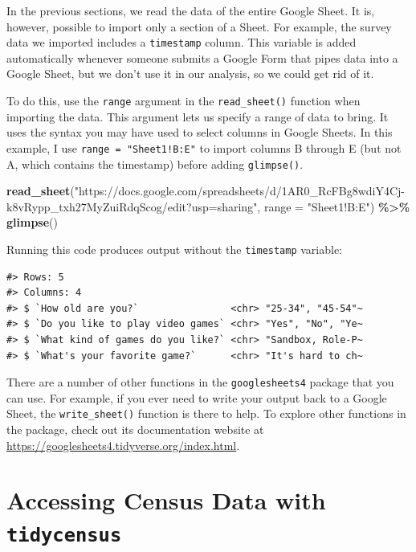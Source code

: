 \documentclass[
]{book}
\newenvironment{Shaded}{\begin{snugshade}}{\end{snugshade}}
\newcommand{\AttributeTok}[1]{\textcolor[rgb]{0.13,0.29,0.53}{#1}}
\newcommand{\FunctionTok}[1]{\textcolor[rgb]{0.13,0.29,0.53}{\textbf{#1}}}
\newcommand{\NormalTok}[1]{#1}
\newcommand{\SpecialCharTok}[1]{\textcolor[rgb]{0.81,0.36,0.00}{\textbf{#1}}}
\newcommand{\StringTok}[1]{\textcolor[rgb]{0.31,0.60,0.02}{#1}}
\begin{document}
In the previous sections, we read the data of the entire Google Sheet. It is, however, possible to import only a section of a Sheet. For example, the survey data we imported includes a \texttt{timestamp} column. This variable is added automatically whenever someone submits a Google Form that pipes data into a Google Sheet, but we don't use it in our analysis, so we could get rid of it.

To do this, use the \texttt{range} argument in the \texttt{read\_sheet()} function when importing the data. This argument lets us specify a range of data to bring. It uses the syntax you may have used to select columns in Google Sheets. In this example, I use \texttt{range\ =\ "Sheet1!B:E"} to import columns B through E (but not A, which contains the timestamp) before adding \texttt{glimpse()}.

\begin{Shaded}
\begin{Highlighting}[]
\FunctionTok{read\_sheet}\NormalTok{(}\StringTok{"https://docs.google.com/spreadsheets/d/1AR0\_RcFBg8wdiY4Cj{-}k8vRypp\_txh27MyZuiRdqScog/edit?usp=sharing"}\NormalTok{,}
           \AttributeTok{range =} \StringTok{"Sheet1!B:E"}\NormalTok{) }\SpecialCharTok{\%\textgreater{}\%} 
  \FunctionTok{glimpse}\NormalTok{()}
\end{Highlighting}
\end{Shaded}

Running this code produces output without the \texttt{timestamp} variable:

\begin{verbatim}
#> Rows: 5
#> Columns: 4
#> $ `How old are you?`                <chr> "25-34", "45-54"~
#> $ `Do you like to play video games` <chr> "Yes", "No", "Ye~
#> $ `What kind of games do you like?` <chr> "Sandbox, Role-P~
#> $ `What's your favorite game?`      <chr> "It's hard to ch~
\end{verbatim}

There are a number of other functions in the \texttt{googlesheets4} package that you can use. For example, if you ever need to write your output back to a Google Sheet, the \texttt{write\_sheet()} function is there to help. To explore other functions in the package, check out its documentation website at \url{https://googlesheets4.tidyverse.org/index.html}.

\hypertarget{accessing-census-data-with-tidycensus}{%
\section*{\texorpdfstring{Accessing Census Data with \texttt{tidycensus}}{Accessing Census Data with tidycensus}}\label{accessing-census-data-with-tidycensus}}
\end{document}
